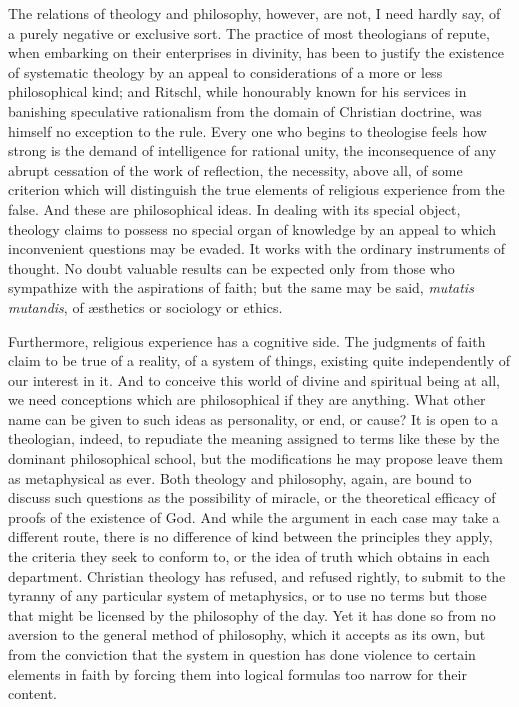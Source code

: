 \documentclass[12pt,a5paper]{article}
\begin{document}
The relations of theology and philosophy, however, are
not, I need hardly say, of a purely negative or exclusive
sort. The practice of most theologians of repute, when
embarking on their enterprises in divinity, has been to
justify the existence of systematic theology by an appeal to
considerations of a more or less philosophical kind; and
Ritschl, while honourably known for his services in banishing
speculative rationalism from the domain of Christian
doctrine, was himself no exception to the rule. Every one
who begins to theologise feels how strong is the demand of
intelligence for rational unity, the inconsequence of any
abrupt cessation of the work of reflection, the necessity,
above all, of some criterion which will distinguish the true
elements of religious experience from the false. And these
are philosophical ideas. In dealing with its special object,
theology claims to possess no special organ of knowledge
by an appeal to which inconvenient questions may
be evaded. It works with the ordinary instruments of
thought. No doubt valuable results can be expected
only from those who sympathize with the aspirations of
faith; but the same may be said, \textit{mutatis mutandis}, of
{\ae}sthetics or sociology or ethics.

Furthermore, religious experience has a cognitive side.
The judgments of faith claim to be true of a reality, of a
system of things, existing quite independently of our interest
in it. And to conceive this world of divine and spiritual
being at all, we need conceptions which are philosophical
if they are anything. What other name can be given to
such ideas as personality, or end, or cause? It is open to
a theologian, indeed, to repudiate the meaning assigned to
terms like these by the dominant philosophical school, but
the modifications he may propose leave them as metaphysical
as ever. Both theology and philosophy, again, are bound
to discuss such questions as the possibility of miracle, or
the theoretical efficacy of proofs of the existence of God.
And while the argument in each case may take a different
route, there is no difference of kind between the principles
they apply, the criteria they seek to conform to, or the idea
of truth which obtains in each department. Christian
theology has refused, and refused rightly, to submit to the
tyranny of any particular system of metaphysics, or to use
no terms but those that might be licensed by the philosophy
of the day. Yet it has done so from no aversion to the
general method of philosophy, which it accepts as its own,
but from the conviction that the system in question has
done violence to certain elements in faith by forcing them
into logical formulas too narrow for their content.
\end{document}
